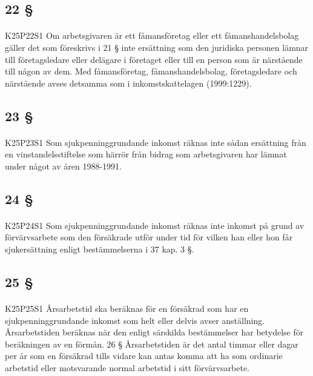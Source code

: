 \documentclass[a4paper,notitlepage,openany,10pt]{book}
\begin{document}
\subsection*{22 §}
\paragraph*{}
{\tiny K25P22S1}
Om arbetsgivaren är ett fåmansföretag eller ett fåmanshandelsbolag gäller det som föreskrivs i 21 § inte ersättning som den juridiska personen lämnar till företagsledare eller delägare i företaget eller till en person som är närstående till någon av dem.
Med fåmansföretag, fåmanshandelsbolag, företagsledare och närstående avses detsamma som i inkomstskattelagen (1999:1229).
\subsection*{23 §}
\paragraph*{}
{\tiny K25P23S1}
Som sjukpenninggrundande inkomst räknas inte sådan ersättning från en vinstandelsstiftelse som härrör från bidrag som arbetsgivaren har lämnat under något av åren 1988-1991.
\subsection*{24 §}
\paragraph*{}
{\tiny K25P24S1}
Som sjukpenninggrundande inkomst räknas inte inkomst på grund av förvärvsarbete som den försäkrade utför under tid för vilken han eller hon får sjukersättning enligt bestämmelserna i 37 kap. 3 §.
\subsection*{25 §}
\paragraph*{}
{\tiny K25P25S1}
Årsarbetstid ska beräknas för en försäkrad som har en sjukpenninggrundande inkomst som helt eller delvis avser anställning. Årsarbetstiden beräknas när den enligt särskilda bestämmelser har betydelse för beräkningen av en förmån. 26 § Årsarbetstiden är det antal timmar eller dagar per år som en försäkrad tills vidare kan antas komma att ha som ordinarie arbetstid eller motsvarande normal arbetstid i sitt förvärvsarbete.
\end{document}
